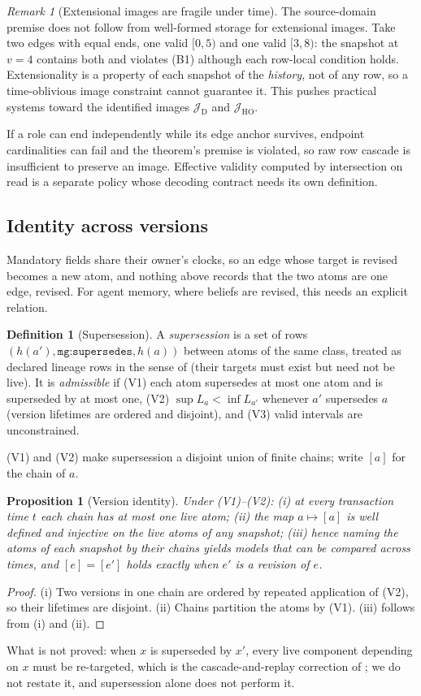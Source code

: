 \documentclass[11pt]{article}
\theoremstyle{plain}
\newtheorem{proposition}[theorem]{Proposition}
\theoremstyle{definition}
\newtheorem{definition}{Definition}
\theoremstyle{remark}
\newtheorem{remark}{Remark}
\newcommand{\mg}[1]{\texttt{mg:#1}}
\newcommand{\Img}[1]{\mathcal J_{\mathrm{#1}}}
\begin{document}
\begin{remark}[Extensional images are fragile under time]\label{rem:fragile}
The source-domain premise does not follow from well-formed storage for extensional
images. Take two edges with equal ends, one valid $[0,5)$ and one valid $[3,8)$: the
snapshot at $v=4$ contains both and violates (B1) although each row-local condition holds.
Extensionality is a property of each snapshot of the \emph{history}, not of any row, so a
time-oblivious image constraint cannot guarantee it. This pushes practical systems toward
the identified images $\Img{D}$ and $\Img{HO}$.
\end{remark}
If a role can end independently while its edge anchor survives, endpoint cardinalities can
fail and the theorem's premise is violated, so raw row cascade is insufficient to preserve
an image. Effective validity computed by intersection on read is a separate policy whose
decoding contract needs its own definition.

\subsection{Identity across versions}
Mandatory fields share their owner's clocks, so an edge whose target is revised becomes a
new atom, and nothing above records that the two atoms are one edge, revised. For agent
memory, where beliefs are revised, this needs an explicit relation.
\begin{definition}[Supersession]\label{def:supersede}
A \emph{supersession} is a set of rows $(h(a'),\mg{supersedes},h(a))$ between atoms of the
same class, treated as declared lineage rows in the sense of \cite{pavlyshyn2026lbg}
(their targets must exist but need not be live). It is \emph{admissible} if
\textup{(V1)} each atom supersedes at most one atom and is superseded by at most one,
\textup{(V2)} $\sup L_a<\inf L_{a'}$ whenever $a'$ supersedes $a$ (version lifetimes are
ordered and disjoint), and
\textup{(V3)} valid intervals are unconstrained.
\end{definition}
(V1) and (V2) make supersession a disjoint union of finite chains; write $[a]$ for the
chain of $a$.
\begin{proposition}[Version identity]\label{prop:versions}
Under (V1)--(V2): (i) at every transaction time $t$ each chain has at most one live
atom; (ii) the map $a\mapsto[a]$ is well defined and injective on the live atoms of any
snapshot; (iii) hence naming the atoms of each snapshot by their chains yields models
that can be compared across times, and $[e]=[e']$ holds exactly when $e'$ is a revision of
$e$.
\end{proposition}
\begin{proof}
(i) Two versions in one chain are ordered by repeated application of (V2), so their
lifetimes are disjoint. (ii) Chains partition the atoms by (V1). (iii) follows from (i)
and (ii).
\end{proof}
What is not proved: when $x$ is superseded by $x'$, every live component depending on $x$
must be re-targeted, which is the cascade-and-replay correction of
\cite{pavlyshyn2026lbg}; we do not restate it, and supersession alone does not perform it.
\end{document}
